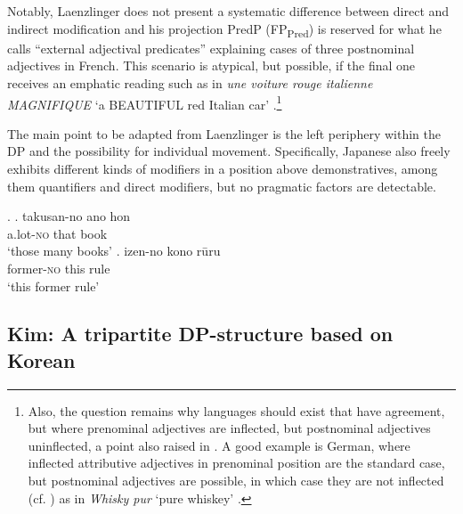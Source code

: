 \documentclass [output=book,colorlinks,citecolor=brown]{langscibook}
\begin{document}
Notably, Laenzlinger does not present a systematic difference between direct and indirect modification and his projection PredP (FP\textsubscript{Pred}) is reserved for what he calls ``external adjectival predicates” \citep[670]{laenzlinger:2005:french} explaining cases of three postnominal adjectives in French. This scenario is atypical, but possible, if the final one receives an emphatic reading such as in \textit{une voiture rouge italienne MAGNIFIQUE} `a BEAUTIFUL red Italian car’ \citep[663–664, 671–672]{laenzlinger:2005:french}.\footnote{Also, the question remains why languages should exist that have agreement, but where prenominal adjectives are inflected, but postnominal adjectives uninflected, a point also raised in \citet[20, Fn. 9]{bortolotto:2016:RA}. A good example is German, where inflected attributive adjectives in prenominal position are the standard case, but postnominal adjectives are possible, in which case they are not inflected (cf. \citealt{trost:2011:whiskey}) as in \textit{Whisky pur} `pure whiskey’ \citep[383]{trost:2006:die}.}

The main point to be adapted from Laenzlinger is the left periphery within the DP and the possibility for individual movement. Specifically, Japanese also freely exhibits different kinds of modifiers in a position above demonstratives, among them quantifiers and direct modifiers, but no pragmatic factors are detectable. %

\ex. \ag. takusan-no ano hon\\
a.lot-\textsc{no} that book\\
`those many books’
\bg. izen-no kono rūru\\
former-\textsc{no} this rule\\
`this former rule’

\subsection{Kim: A tripartite DP-structure based on Korean} \label{kimsaccount}
\end{document}
